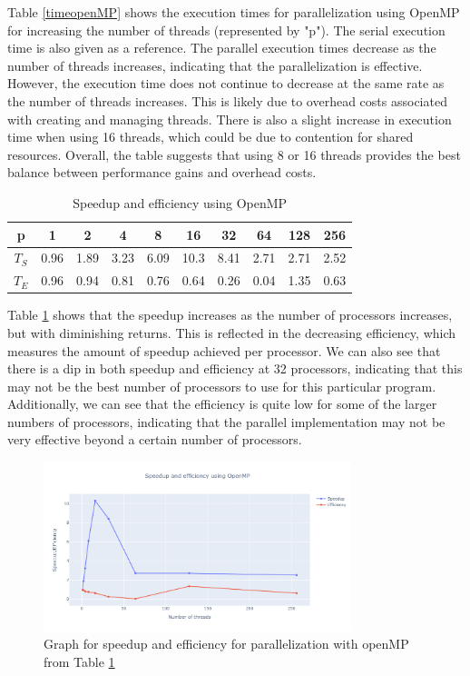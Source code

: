 \documentclass[11pt]{article}
\begin{document}
Table \ref{timeopenMP} shows the execution times for parallelization using OpenMP for increasing the number of threads (represented by "p"). The serial execution time is also given as a reference. The parallel execution times decrease as the number of threads increases, indicating that the parallelization is effective. However, the execution time does not continue to decrease at the same rate as the number of threads increases. This is likely due to overhead costs associated with creating and managing threads. There is also a slight increase in execution time when using 16 threads, which could be due to contention for shared resources. Overall, the table suggests that using 8 or 16 threads provides the best balance between performance gains and overhead costs.

\begin{table}[H]
\centering
\begin{tabular}{|c|c|c|c|c|c|c|c|c|c|}
\hline
 p      & 1 & 2 & 4 & 8 & 16 & 32 & 64 & 128 & 256 \\ \hline
 $T_{S}$  & 0.96 & 1.89 & 3.23 & 6.09 & 10.3 & 8.41 & 2.71 & 2.71 & 2.52 \\ \hline
 $T_{E}$  & 0.96 & 0.94 & 0.81 & 0.76 & 0.64 & 0.26 & 0.04 & 1.35 & 0.63 \\ \hline
\end{tabular}
\caption{Speedup and efficiency using OpenMP} \label{speedupefficiencyomp}
\end{table}


\bigskip

Table \ref{speedupefficiencyomp} shows that the speedup increases as the number of processors increases, but with diminishing returns. This is reflected in the decreasing efficiency, which measures the amount of speedup achieved per processor. We can also see that there is a dip in both speedup and efficiency at 32 processors, indicating that this may not be the best number of processors to use for this particular program. Additionally, we can see that the efficiency is quite low for some of the larger numbers of processors, indicating that the parallel implementation may not be very effective beyond a certain number of processors.



\begin{figure}[H]
    \centering
    \includegraphics[width=0.8\textwidth]{Plots/speedup_omp.png}
    \caption{Graph for speedup and efficiency for parallelization with openMP from Table \ref{speedupefficiencyomp}}
    \label{fig:speedup_omp}
\end{figure}
\end{document}
